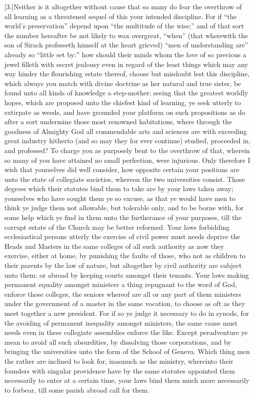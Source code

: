 [3.]Neither is it altogether without cause that so many do fear the overthrow of all learning as a threatened sequel of this your intended discipline. For if “the world’s preservation” depend upon “the multitude of the wise;” and of that sort the number hereafter be not likely to wax overgreat, “when” (that wherewith the son of Sirach professeth himself at the heart grieved) “men of understanding are” already so “little set by:” how should their minds whom the love of so precious a jewel filleth with secret jealousy even in regard of the least things which may any way hinder the flourishing estate thereof, choose but misdoubt lest this discipline, which always you match with divine doctrine as her natural and true sister, be found unto all kinds of knowledge a step-mother; seeing that the greatest worldly hopes, which are proposed unto the chiefest kind of learning, ye seek utterly to extirpate as weeds, and have grounded your platform on such propositions as do after a sort undermine those most renowned habitations, where through the goodness of Almighty God all commendable arts and sciences are with exceeding great industry hitherto (and so may they for ever continue) studied, proceeded in, and professed? To charge you as purposely bent to the overthrow of that, wherein so many of you have attained no small perfection, were injurious. Only therefore I wish that yourselves did well consider, how opposite certain your positions are unto the state of collegiate societies, whereon the two universities consist. Those degrees which their statutes bind them to take are by your laws taken away; yourselves who have sought them ye so excuse, as that ye would have men to think ye judge them not allowable, but tolerable only, and to be borne with, for some help which ye find in them unto the furtherance of your purposes, till the corrupt estate of the Church may be better reformed. Your laws forbidding ecclesiastical persons utterly the exercise of civil power must needs deprive the Heads and Masters in the same colleges of all such authority as now they exercise, either at home, by punishing the faults of those, who not as children to their parents by the law of nature, but altogether by civil authority are subject unto them: or abroad by keeping courts amongst their tenants. Your laws making permanent equality amongst ministers a thing repugnant to the word of God, enforce those colleges, the seniors whereof are all or any part of them ministers under the government of a master in the same vocation, to choose as oft as they meet together a new president. For if so ye judge it necessary to do in synods, for the avoiding of permanent inequality amongst ministers, the same cause must needs even in these collegiate assemblies enforce the like. Except peradventure ye mean to avoid all such absurdities, by dissolving those corporations, and by bringing the universities unto the form of the School of Geneva. Which thing men the rather are inclined to look for, inasmuch as the ministry, whereinto their founders with singular providence have by the same statutes appointed them necessarily to enter at a certain time, your laws bind them much more necessarily to forbear, till some parish abroad call for them.


